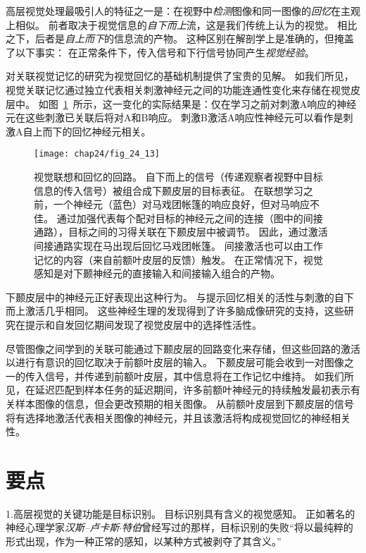 高层视觉处理最吸引人的特征之一是：在视野中\textit{检测}图像和同一图像的\textit{回忆}在主观上相似。
前者取决于视觉信息的\textit{自下而上}流，这是我们传统上认为的视觉。
相比之下，后者是\textit{自上而下}的信息流的产物。
这种区别在解剖学上是准确的，但掩盖了以下事实：
在正常条件下，传入信号和下行信号协同产生\textit{视觉经验}。


对关联视觉记忆的研究为视觉回忆的基础机制提供了宝贵的见解。
如我们所见，视觉关联记忆通过独立代表相关刺激神经元之间的功能连通性变化来存储在视觉皮层中。
如图~\ref{fig:24_13}~所示，这一变化的实际结果是：仅在学习之前对刺激A响应的神经元在这些刺激已关联后将对A和B响应。
刺激B激活A响应性神经元可以看作是刺激A自上而下的回忆神经元相关。


\begin{figure}[htbp]
	\centering
	\texttt{[image: chap24/fig\_24\_13]}
	\caption{视觉联想和回忆的回路。
		自下而上的信号（传递观察者视野中目标信息的传入信号）被组合成下颞皮层的目标表征。
		在联想学习之前，一个神经元（蓝色）对马戏团帐篷的响应良好，但对马响应不佳。
		通过加强代表每个配对目标的神经元之间的连接（图中的间接通路），目标之间的习得关联在下颞皮层中被调节。
		因此，通过激活间接通路实现在马出现后回忆马戏团帐篷。
		间接激活也可以由工作记忆的内容（来自前额叶皮层的反馈）触发。
		在正常情况下，视觉感知是对下颞神经元的直接输入和间接输入组合的产物。}
	\label{fig:24_13}
\end{figure}


下颞皮层中的神经元正好表现出这种行为。
与提示回忆相关的活性与刺激的自下而上激活几乎相同。
这些神经生理的发现得到了许多脑成像研究的支持，这些研究在提示和自发回忆期间发现了视觉皮层中的选择性活性。


尽管图像之间学到的关联可能通过下颞皮层的回路变化来存储，但这些回路的激活以进行有意识的回忆取决于前额叶皮层的输入。
下颞皮层可能会收到一对图像之一的传入信号，并传递到前额叶皮层，其中信息将在工作记忆中维持。
如我们所见，在延迟匹配到样本任务的延迟期间，许多前额叶神经元的持续触发最初表示有关样本图像的信息，但会更改预期的相关图像。
从前额叶皮层到下颞皮层的信号将有选择地激活代表相关图像的神经元，并且该激活将构成视觉回忆的神经相关性。



\section{要点}

1.高层视觉的关键功能是目标识别。
目标识别具有含义的视觉感知。
正如著名的神经心理学家\textit{汉斯–卢卡斯$\cdot$特伯}曾经写过的那样，目标识别的失败“将以最纯粹的形式出现，作为一种正常的感知，以某种方式被剥夺了其含义。” 


